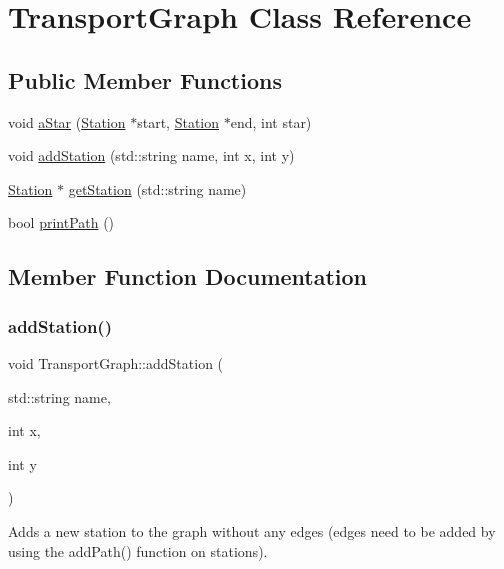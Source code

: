 \hypertarget{class_transport_graph}{}\section{Transport\+Graph Class Reference}
\label{class_transport_graph}
\subsection*{Public Member Functions}
\begin{DoxyCompactItemize}
\item 
void \mbox{\hyperlink{class_transport_graph_a2272ac3ddfd7efee405d36d44108037d}{a\+Star}} (\mbox{\hyperlink{class_station}{Station}} $\ast$start, \mbox{\hyperlink{class_station}{Station}} $\ast$end, int star)
\item 
void \mbox{\hyperlink{class_transport_graph_a5c654fc84244b63cb8171eb92d072910}{add\+Station}} (std\+::string name, int x, int y)
\item 
\mbox{\hyperlink{class_station}{Station}} $\ast$ \mbox{\hyperlink{class_transport_graph_a2ed30af16042cda3aa65b5b6b57deb62}{get\+Station}} (std\+::string name)
\item 
bool \mbox{\hyperlink{class_transport_graph_adcd1d4c8068b5b524cbd323061caf068}{print\+Path}} ()
\end{DoxyCompactItemize}


\subsection{Member Function Documentation}
\mbox{\label{class_transport_graph_a5c654fc84244b63cb8171eb92d072910}} 
\subsubsection{\texorpdfstring{addStation()}{addStation()}}
{\footnotesize\ttfamily void Transport\+Graph\+::add\+Station (\begin{DoxyParamCaption}\item[{std\+::string}]{name,  }\item[{int}]{x,  }\item[{int}]{y }\end{DoxyParamCaption})}

Adds a new station to the graph without any edges (edges need to be added by using the add\+Path() function on stations).


